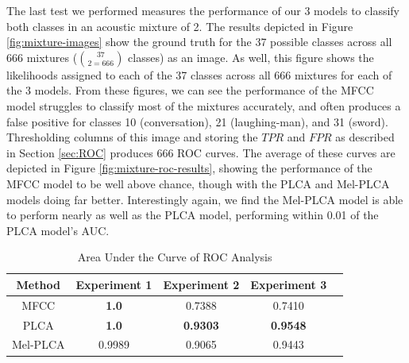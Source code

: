 \documentclass[a4paper,10pt,final]{ThesisStyle}
\begin{document}
The last test we performed measures the performance of our 3 models to classify both classes in an acoustic mixture of 2.  The results depicted in Figure \ref{fig:mixture-images} show the ground truth for the 37 possible classes across all 666 mixtures ($37 \choose 2 = 666$ classes) as an image.  As well, this figure shows the likelihoods assigned to each of the 37 classes across all 666 mixtures for each of the 3 models.  From these figures, we can see the performance of the MFCC model struggles to classify most of the mixtures accurately, and often produces a false positive for classes 10 (conversation), 21 (laughing-man), and 31 (sword).  Thresholding columns of this image and storing the $TPR$ and $FPR$ as described in Section \ref{sec:ROC} produces 666 ROC curves.  The average of these curves are depicted in Figure \ref{fig:mixture-roc-results}, showing the performance of the MFCC model to be well above chance, though with the PLCA and Mel-PLCA models doing far better.  Interestingly again, we find the Mel-PLCA model is able to perform nearly as well as the PLCA model, performing within 0.01 of the PLCA model's AUC.  


\begin{table}
\centering
\caption{Area Under the Curve of ROC Analysis}
\begin{tabular}{|c|c|c|c|l|} \hline
Method&Experiment 1&Experiment 2&Experiment 3\\ \hline
MFCC&\textbf{1.0}&0.7388&0.7410\\ \hline
PLCA&\textbf{1.0}&\textbf{0.9303}&\textbf{0.9548}\\ \hline
Mel-PLCA&0.9989&0.9065&0.9443\\ \hline
\end{tabular}
\end{table}

\end{document}
